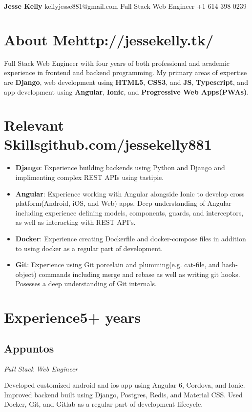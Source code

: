 \documentclass[letterpaper,11pt]{article}
\begin{document}
\begin{flushleft}
\Large{\textbf{Jesse Kelly}}
\hfill
kellyjesse881@gmail.com
\newline
Full Stack Web Engineer
\hfill
+1 614 398 0239
\end{flushleft}

\section{About Me\hfill http://jessekelly.tk/}
Full Stack Web Engineer with four years of both
professional and academic experience in frontend
and backend programming. My primary areas of
expertise are \textbf{Django}, web development using \textbf{HTML5},
\textbf{CSS3}, and \textbf{JS}, \textbf{Typescript}, and app development using
\textbf{Angular}, \textbf{Ionic}, and \textbf{Progressive Web Apps(PWAs)}.

\section{Relevant Skills\hfill github.com/jessekelly881}
\begin{itemize}
\item \textbf{Django}: Experience building backends using Python and Django and implimenting complex REST APIs using tastipie.
\item \textbf{Angular}: Experience working with Angular alongside Ionic to develop cross platform(Android, iOS, and Web) apps. Deep understanding of Angular including experience defining models, components, guards, and interceptors, as well as interacting with REST API's.
\item \textbf{Docker}: Experience creating Dockerfile and docker-compose files in addition to using docker as a regular part of development.
\item \textbf{Git}: Experience using Git porcelain and plumming(e.g. cat-file, and hash-object) commands including merge and rebase as well as writing git hooks. Posesses a deep understanding of Git internals.
\end{itemize}

\section{Experience\hfill 5+ years}
\subsection{Appuntos}
\textit{Full Stack Web Engineer}
\vspace{2mm}
\begin{adjustwidth}{1cm}{1cm}
Developed customized android and ios
app using Angular 6, Cordova, and Ionic.
Improved backend built using Django,
Postgres, Redis, and Material CSS. Used
Docker, Git, and Gitlab as a regular part
of development lifecycle.
\end{adjustwidth}
\end{document}
